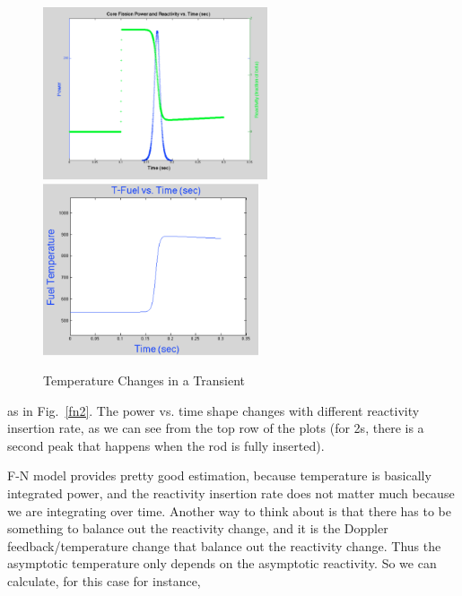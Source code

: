 \documentclass{school-22.211-notes}
\begin{document}
\begin{figure}[ht]
  \centering
  \includegraphics[width=2.6in]{images/pke/FN2-plot1.png}
  \includegraphics[width=2.5in]{images/pke/FN2-plot2.png}
  \caption{Temperature Changes in a Transient} \label{FN2-plots}
\end{figure}


\clearpage
{}
  as in Fig.~\ref{fn2}. The power vs. time shape changes with different reactivity insertion rate, as we can see from the top row of the plots (for 2s, there is a second peak that happens when the rod is fully inserted). 

F-N model provides pretty good estimation, because temperature is basically integrated power, and the reactivity insertion rate does not matter much because we are integrating over time. Another way to think about is that there has to be something to balance out the reactivity change, and it is the Doppler feedback/temperature change that balance out the reactivity change. Thus the asymptotic temperature only depends on the asymptotic reactivity. So we can calculate, for this case for instance, 
\end{document}

